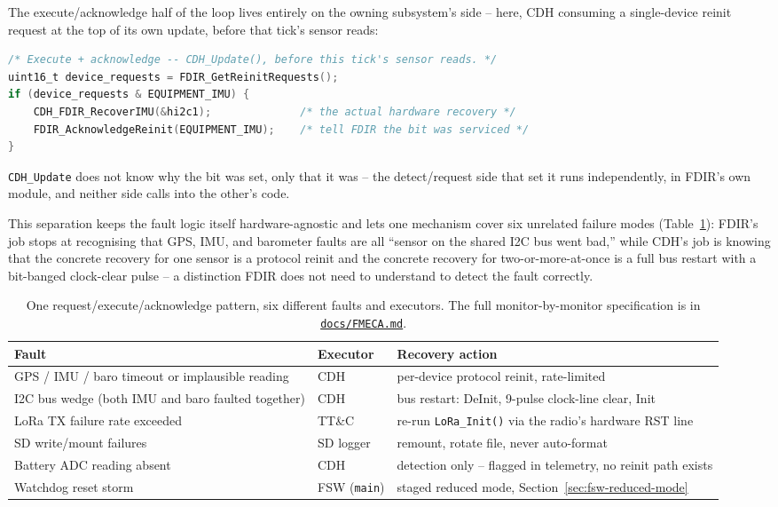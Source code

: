 The execute/acknowledge half of the loop lives entirely on the owning
subsystem's side -- here, CDH consuming a single-device reinit request at
the top of its own update, before that tick's sensor reads:

\begin{lstlisting}[language=C]
/* Execute + acknowledge -- CDH_Update(), before this tick's sensor reads. */
uint16_t device_requests = FDIR_GetReinitRequests();
if (device_requests & EQUIPMENT_IMU) {
    CDH_FDIR_RecoverIMU(&hi2c1);              /* the actual hardware recovery */
    FDIR_AcknowledgeReinit(EQUIPMENT_IMU);    /* tell FDIR the bit was serviced */
}
\end{lstlisting}

\texttt{CDH\_Update} does not know why the bit was set, only that it was --
the detect/request side that set it runs independently, in FDIR's own
module, and neither side calls into the other's code.

This separation keeps the fault logic itself hardware-agnostic and lets
one mechanism cover six unrelated failure modes (Table~\ref{tab:fsw-fdir-instances}):
FDIR's job stops at recognising that GPS, IMU, and barometer faults are
all ``sensor on the shared I2C bus went bad,'' while CDH's job is knowing
that the concrete recovery for one sensor is a protocol reinit and the
concrete recovery for two-or-more-at-once is a full bus restart with a
bit-banged clock-clear pulse -- a distinction FDIR does not need to
understand to detect the fault correctly.

\begin{table}[H]
\centering
\begin{tabular}{p{4.3cm}p{1.8cm}p{7.2cm}}
\toprule
\textbf{Fault} & \textbf{Executor} & \textbf{Recovery action} \\
\midrule
GPS / IMU / baro timeout or implausible reading & CDH & per-device protocol reinit, rate-limited \\
I2C bus wedge (both IMU and baro faulted together) & CDH & bus restart: DeInit, 9-pulse clock-line clear, Init \\
LoRa TX failure rate exceeded & TT\&C & re-run \texttt{LoRa\_Init()} via the radio's hardware RST line \\
SD write/mount failures & SD logger & remount, rotate file, never auto-format \\
Battery ADC reading absent & CDH & detection only -- flagged in telemetry, no reinit path exists \\
Watchdog reset storm & FSW (\texttt{main}) & staged reduced mode, Section~\ref{sec:fsw-reduced-mode} \\
\bottomrule
\end{tabular}
\caption{One request/execute/acknowledge pattern, six different faults and
executors. The full monitor-by-monitor specification is in
\href{\repourl/blob/main/firmware-stm32/docs/FMECA.md}{\texttt{docs/FMECA.md}}.}
\label{tab:fsw-fdir-instances}
\end{table}

